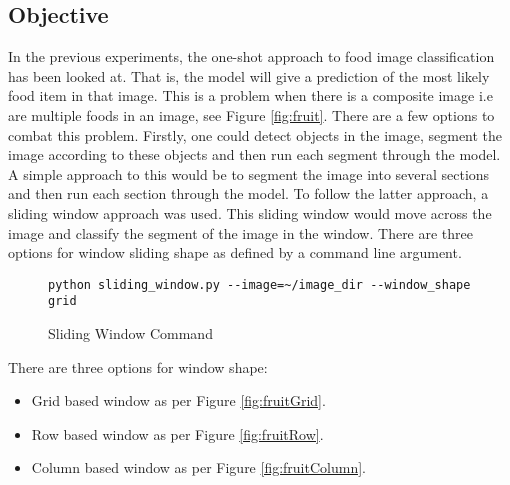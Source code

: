\tocless\subsection{Objective}
In the previous experiments, the one-shot approach to food image
classification has been looked at. That is, the model will give a prediction of the most likely
food item in that image. This is a problem when there is a composite image i.e are multiple foods in an
image, see Figure \ref{fig:fruit}. There are a few options to combat this problem. Firstly, one could detect
objects in the image, segment the image according to these objects and then run
each segment through the model.
A simple approach to this would be to segment
the image into several sections and then run each section through the model.
To follow the latter approach, a sliding window approach was used. This
sliding window would move across the image and classify the segment of the image
in the window. There are three options for window sliding shape as defined by a
command line argument.

\begin{figure}
\caption{Sliding Window Command}
\label{lst:slidingWindowCommand}
\begin{lstlisting}[style=Command]
python sliding_window.py --image=~/image_dir --window_shape grid
\end{lstlisting}
\end{figure}

There are three options for window shape:
\begin{itemize}
	\item{Grid based window as per Figure \ref{fig:fruitGrid}}.
	\item{Row based window as per Figure \ref{fig:fruitRow}}.
	\item{Column based window as per Figure \ref{fig:fruitColumn}}.
\end{itemize}

